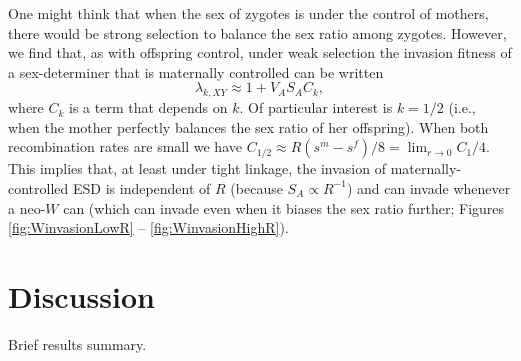 \documentclass[12pt]{article}
\begin{document}
One might think that when the sex of zygotes is under the control of mothers, there would be strong selection to balance the sex ratio among zygotes. 
However, we find that, as with offspring control, under weak selection the invasion fitness of a sex-determiner that is maternally controlled can be written
\begin{equation}
\lambda_{k,XY} \approx 1 + V_A S_A C_k,
\end{equation}
where
$C_k$ is a term that depends on $k$.
%
%
%
%
Of particular interest is $k=1/2$ (i.e., when the mother perfectly balances the sex ratio of her offspring).
When both recombination rates are small we have $C_{1/2} \approx R(s^m - s^f)/8 = \lim_{r \rightarrow 0} C_1/4$.
This implies that, at least under tight linkage, the invasion of maternally-controlled ESD is independent of $R$ (because $S_A\propto R^{-1}$) and can invade whenever a neo-$W$ can (which can invade even when it biases the sex ratio further; Figures \ref{fig:WinvasionLowR} -- \ref{fig:WinvasionHighR}).

\section*{Discussion}

Brief results summary. 
\end{document}

